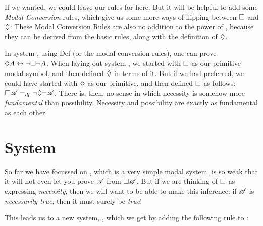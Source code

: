 If we wanted, we could leave our rules for \mlK{} here. But it will be helpful to add some \emph{Modal Conversion} rules, which give us some more ways of flipping between $\Box$ and $\Diamond$:
These Modal Conversion Rules are also no addition to the power of \mlK, because they can be derived from the basic rules, along with the definition of $\Diamond$.

In system \mlK, using Def\ediamond{} (or the modal conversion rules), one can prove $\Diamond A \leftrightarrow \neg\Box\neg A$. When laying out system \mlK, we started with $\Box$ as our primitive modal symbol, and then defined $\Diamond$ in terms of it. But if we had preferred, we could have started with $\Diamond$ as our primitive, and then defined $\Box$ as follows: $\Box\mathscr{A} =_{df} \neg \Diamond \neg \mathscr{A}$. There is, then, no sense in which necessity is somehow more \emph{fundamental} than possibility. Necessity and possibility are exactly as fundamental as each other.

\section{System \mlT}
\label{T}

So far we have focussed on \mlK, which is a very simple modal system. \mlK{} is so weak that it will not even let you prove $\mathscr{A}$ from $\Box\mathscr{A}$. But if we are thinking of $\Box$ as expressing \emph{necessity}, then we will want to be able to make this inference: if $\mathscr{A}$ is \emph{necessarily true}, then it must surely be \emph{true}!

This leads us to a new system,  \mlT, which we get by adding the following rule to \mlK:

